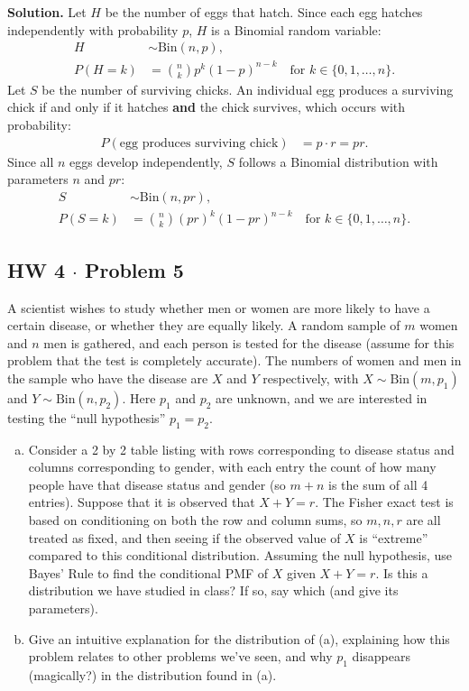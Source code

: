 \documentclass[11pt,a4paper]{article}
\begin{document}
\noindent \textbf{Solution.} Let $H$ be the number of eggs that hatch. Since each egg hatches independently with probability $p$, $H$ is a Binomial random variable:
\begin{align*}
H &\sim \text{Bin}(n, p), \\
P(H = k) &= \binom{n}{k} p^k (1 - p)^{n-k} \quad \text{for } k \in \{0, 1, \dots, n\}.
\end{align*}
Let $S$ be the number of surviving chicks. An individual egg produces a surviving chick if and only if it hatches \textbf{and} the chick survives, which occurs with probability:
\begin{align*}
P(\text{egg produces surviving chick}) &= p \cdot r = pr.
\end{align*}
Since all $n$ eggs develop independently, $S$ follows a Binomial distribution with parameters $n$ and $pr$:
\begin{align*}
S &\sim \text{Bin}(n, pr), \\
P(S = k) &= \binom{n}{k} (pr)^k (1 - pr)^{n-k} \quad \text{for } k \in \{0, 1, \dots, n\}.
\end{align*}

\vspace{10pt}
\subsection{HW 4 $\cdot$ Problem 5}
\begin{tcolorbox}[title={HW 4 $\cdot$ Problem 5}]
A scientist wishes to study whether men or women are more likely to have a certain disease, or whether they are equally likely. A random sample of $m$ women and $n$ men is gathered, and each person is tested for the disease (assume for this problem that the test is completely accurate). The numbers of women and men in the sample who have the disease are $X$ and $Y$ respectively, with $X \sim \text{Bin}(m, p_1)$ and $Y \sim \text{Bin}(n, p_2)$. Here $p_1$ and $p_2$ are unknown, and we are interested in testing the ``null hypothesis'' $p_1 = p_2$.
\begin{enumerate}[(a)]
\item Consider a 2 by 2 table listing with rows corresponding to disease status and columns corresponding to gender, with each entry the count of how many people have that disease status and gender (so $m+n$ is the sum of all 4 entries). Suppose that it is observed that $X + Y = r$.
The Fisher exact test is based on conditioning on both the row and column sums, so $m, n, r$ are all treated as fixed, and then seeing if the observed value of $X$ is ``extreme'' compared to this conditional distribution. Assuming the null hypothesis, use Bayes' Rule to find the conditional PMF of $X$ given $X + Y = r$. Is this a distribution we have studied in class? If so, say which (and give its parameters).
\item Give an intuitive explanation for the distribution of (a), explaining how this problem relates to other problems we've seen, and why $p_1$ disappears (magically?) in the distribution found in (a).
\end{enumerate}
\end{tcolorbox}
\end{document}
